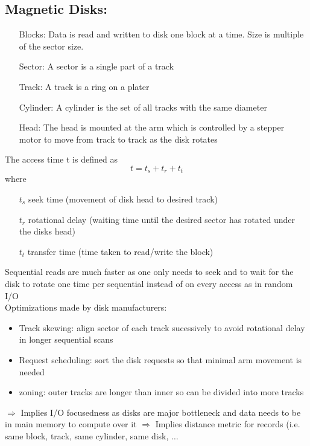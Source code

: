     \subsection{Magnetic Disks:}
        \begin{enumerate}
            \item[Blocks:] Data is read and written to disk one block at a time. Size is multiple of the sector size.
            \item[Sector:] A sector is a single part of a track
            \item[Track:] A track is a ring on a plater
            \item[Cylinder:] A cylinder is the set of all tracks with the same diameter
            \item[Head:] The head is mounted at the arm which is controlled by a stepper motor to move from track to track as the disk rotates
        \end{enumerate}
        The access time t is defined as \[ t = t_s + t_r + t_t \]
        where \begin{itemize}
            \item[$t_s$] seek time (movement of disk head to desired track)
            \item[$t_r$] rotational delay (waiting time until the desired sector has rotated under the disks head)
            \item[$t_t$] transfer time (time taken to read/write the block) 
        \end{itemize}
        Sequential reads are much faster as one only needs to seek and to wait for the disk to rotate one time per sequential instead of on every access as in random I/O \\
        Optimizations made by disk manufacturers:
        \begin{itemize}
            \item Track skewing: align sector of each track sucessively to avoid rotational delay in longer sequential scans
            \item Request scheduling: sort the disk requests so that minimal arm movement is needed
            \item zoning: outer tracks are longer than inner so can be divided into more tracks
        \end{itemize}
        $\Rightarrow$ Implies I/O focusedness as disks are major bottleneck and data needs to be in main memory to compute over it
        $\Rightarrow$ Implies distance metric for records (i.e. same block, track, same cylinder, same disk, $\dots$ \\
        
